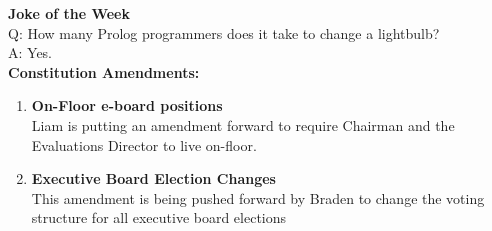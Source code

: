 \documentclass[9pt]{extarticle}
\begin{document}
\begin{minipage}[t]{.35\linewidth}
\begin{mdframed}[style=sidebar,frametitle={}]
\textbf{Joke of the Week} \\
Q: How many Prolog programmers does it take to change a lightbulb? \\
A: Yes.
\\


\textbf{Constitution Amendments:}
\begin{enumerate}[leftmargin=0.5cm]
\item \textbf{On-Floor e-board positions} \\
	Liam is putting an amendment forward to require Chairman and the Evaluations Director to live on-floor.
\\
\item \textbf{Executive Board Election Changes} \\
	This amendment is being pushed forward by Braden to change the voting structure for all executive board elections 
\end{enumerate}


\end{mdframed}
\end{minipage}\hfill %
%
%
\end{document}
